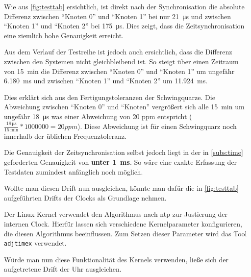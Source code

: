 Wie aus \autoref{fig:testtab} ersichtlich, ist direkt nach der Synchronisation
die absolute Differenz zwischen "`Knoten 0"' und "`Knoten 1"' bei nur
\SI{21}{\us} und zwischen "`Knoten 1"' und "`Knoten 2"' bei \SI{175}{\us}. Dies
zeigt, dass die Zeitsynchronisation eine ziemlich hohe Genauigkeit erreicht.

Aus dem Verlauf der Testreihe ist jedoch auch ersichtlich, dass die Differenz
zwischen den Systemen nicht gleichbleibend ist. So steigt über einen Zeitraum
von \SI{15}{\minute} die Differenz zwischen "`Knoten 0"' und "`Knoten 1"' um
ungefähr \SI{6,180}{\ms} und zwischen "`Knoten 1"' und "`Knoten 2"' um
\SI{11,924}{\ms}.

Dies erklärt sich aus den Fertigungstoleranzen der Schwingquarze. Die Abweichung
zwischen "`Knoten 0"' und "`Knoten"' vergrößert sich alle \SI{15}{\minute} um
ungefähr \SI{18}{\us} was einer Abweichung von 20 ppm entspricht
($\frac{\SI{18}{\us}}{\SI{15}{\minute}}*1000000=20\mathit{ppm}$).
Diese Abweichung ist für einen Schwingquarz noch innerhalb der üblichen
Frequenztoleranz.

Die Genauigkeit der Zeitsynchronisation selbst jedoch liegt in der in
\autoref{subs:time} geforderten Genauigkeit von \textbf{unter \SI{1}{\ms}}. So
wäre eine exakte Erfassung der Testdaten zumindest anfänglich noch möglich.

Wollte man diesen Drift nun ausgleichen, könnte man dafür die in
\autoref{fig:testtab} aufgeführten Drifts der Clocks als Grundlage nehmen.

Der Linux-Kernel verwendet den Algorithmus nach \gls{ntp}\cite{RFC1305} zur
Justierung der internen Clock. Hierfür lassen sich verschiedene Kernelparameter
konfigurieren, die diesen Algorithmus beeinflussen. Zum Setzen dieser Parameter
wird das Tool \texttt{adjtimex} verwendet.

Würde man nun diese Funktionalität des Kernels verwenden, ließe sich der
aufgetretene Drift der Uhr ausgleichen.